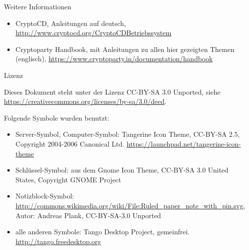 \documentclass{beamer}
\begin{document}
\begin{frame}{Weitere Informationen}
\begin{itemize}
	\item CryptoCD, Anleitungen auf deutsch, 
		\url{http://www.cryptocd.org/CryptoCDBetriebssystem}
	\item Cryptoparty Handbook, mit Anleitungen zu allen hier gezeigten Themen
		(englisch), \url{https://www.cryptoparty.in/documentation/handbook}
\end{itemize}
\end{frame}

\begin{frame}{Lizenz}
\begin{center}
Dieses Dokument steht unter der Lizenz CC-BY-SA 3.0 Unported, siehe
\url{https://creativecommons.org/licenses/by-sa/3.0/deed}.

\cc\bysa
\end{center}

\footnotesize
Folgende Symbole wurden benutzt:
\begin{itemize}
	\item Server-Symbol, Computer-Symbol: Tangerine Icon Theme, CC-BY-SA 2.5,
		Copyright 2004-2006 Canonical Ltd.
		\url{https://launchpad.net/tangerine-icon-theme}
	\item Schlüssel-Symbol: aus dem Gnome Icon Theme, CC-BY-SA 3.0 United States,
		Copyright GNOME Project
	\item Notizblock-Symbol:
		\url{http://commons.wikimedia.org/wiki/File:Ruled_paper_note_with_pin.svg},
		Autor: Andreas Plank, CC-BY-SA-3.0 Unported
	\item alle anderen Symbole: Tango Desktop Project, gemeinfrei.
		\url{http://tango.freedesktop.org}
\end{itemize}
\end{frame}
\end{document}
